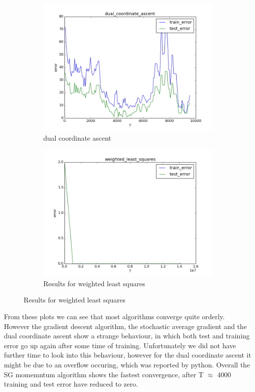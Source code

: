 \documentclass{article}
\begin{document}
\begin{figure}
	\centering
	\begin{subfigure}[b]{0.45\textwidth} 
		\includegraphics[width=\textwidth]{../results/dual_coordinate_ascent.png}
		\caption{dual coordinate ascent}
		\label{fig9}
	\end{subfigure}
	\begin{subfigure}[b]{0.45\textwidth} 
		\includegraphics[width=\textwidth]{../results/weighted_least_squares.png}
		\caption{Results for weighted least squares}
		\label{fig10}
	\end{subfigure}
\end{figure}
		
From these plots we can see that most algorithms converge quite orderly. However the gradient descent algorithm, the stochastic average gradient and the dual coordinate ascent show a strange behaviour, in which both test and training error go up again after some time of training.
Unfortunately we did not have further time to look into this behaviour, however for the dual coordinate ascent it might be due to an overflow occuring, which was reported by python.
Overall the SG momemntum algorithm shows the fastest convergence, after T $\approx$ 4000 training and test error have reduced to zero.
\end{document}

